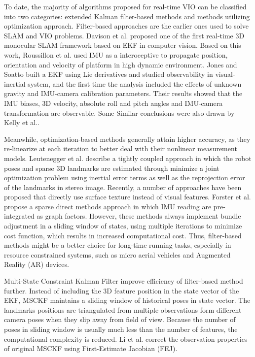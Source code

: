 \documentclass[a4paper, 10pt, conference]{ieeeconf}      %
\begin{document}
To date, the majority of algorithms proposed for real-time VIO can be classified into two categories: extended Kalman filter-based methods and methods utilizing optimization approach. Filter-based approaches are the earlier ones used to solve SLAM and VIO problems. Davison et al. proposed one of the first real-time 3D monocular SLAM framework based on EKF in computer vision\cite{davison2007monoslam}. Based on this work, Roussillon et al. used IMU as a interoceptive to propagate position, orientation and velocity of platform in high dynamic environment\cite{roussillon2012high}. Jones and Soatto\cite{jones2011visual} built a EKF using Lie derivatives and studied observability in visual-inertial system, and the first time the analysis included the effects of unknown gravity and IMU-camera calibration parameters. Their results showed that the IMU biases, 3D velocity, absolute roll and pitch angles and IMU-camera transformation are observable. Some Similar conclusions were also drawn by  Kelly  et al.\cite{kelly2008combined}.


Meanwhile, optimization-based methods generally attain higher accuracy, as they re-linearize at each iteration to better deal with their nonlinear measurement models.
Leutenegger et al. describe a tightly coupled approach in which the robot poses and sparse 3D landmarks are estimated through minimize  a joint optimization problem using inertial error terms as well as the reprojection error of the landmarks in stereo image\cite{leutenegger2015keyframe}. Recently, a number of approaches have been proposed that directly use surface texture instead of visual features. Forster et al. propose a sparse direct methods approach in which IMU reading are pre-integrated as graph factors\cite{forster2015imu}. However, these methods always implement bundle adjustment in a sliding window of states, using multiple iterations to minimize cost function, which results in increased computational cost. Thus, filter-based methods might be a better choice for long-time running tasks, especially in resource constrained systems, such as micro aerial vehicles and Augmented Reality (AR) devices\cite{li2014visual}.

Multi-State Constraint Kalman Filter improve efficiency of filter-based method further\cite{mourikis2007multi}. Instead of including the 3D feature position in the state vector of the EKF, MSCKF maintains a sliding window of historical poses in state vector. The landmarks positions are triangulated from multiple observations form different camera poses when they slip away from field of view. Because the number of poses in sliding window is usually much less than the number of features, the computational complexity is reduced. Li et al. correct the observation properties of original MSCKF using First-Estimate Jacobian (FEJ)\cite{li2013high}. 
\end{document}
